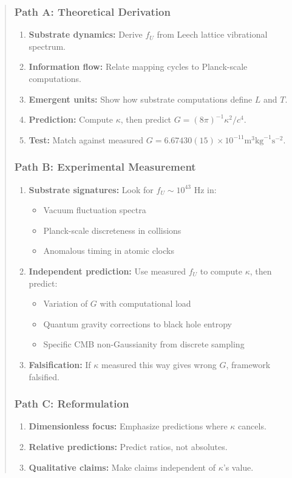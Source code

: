 \documentclass[11pt,titlepage]{article}
\begin{document}
\begin{abstract}
\subsubsection{Path A: Theoretical Derivation}
\begin{enumerate}
\item \textbf{Substrate dynamics:} Derive $f_U$ from Leech lattice vibrational spectrum.
\item \textbf{Information flow:} Relate mapping cycles to Planck-scale computations.
\item \textbf{Emergent units:} Show how substrate computations define $L$ and $T$.
\item \textbf{Prediction:} Compute $\kappa$, then predict $G = (8\pi)^{-1} \kappa^2 / c^4$.
\item \textbf{Test:} Match against measured $G = 6.67430(15) \times 10^{-11} \text{m}^3\text{kg}^{-1}\text{s}^{-2}$.
\end{enumerate}

\subsubsection{Path B: Experimental Measurement}
\begin{enumerate}
\item \textbf{Substrate signatures:} Look for $f_U \sim 10^{43}$ Hz in:
\begin{itemize}
\item Vacuum fluctuation spectra
\item Planck-scale discreteness in collisions
\item Anomalous timing in atomic clocks
\end{itemize}

\item \textbf{Independent prediction:} Use measured $f_U$ to compute $\kappa$, then predict:
\begin{itemize}
\item Variation of $G$ with computational load
\item Quantum gravity corrections to black hole entropy
\item Specific CMB non-Gaussianity from discrete sampling
\end{itemize}

\item \textbf{Falsification:} If $\kappa$ measured this way gives wrong $G$, framework falsified.
\end{enumerate}

\subsubsection{Path C: Reformulation}
\begin{enumerate}
\item \textbf{Dimensionless focus:} Emphasize predictions where $\kappa$ cancels.
\item \textbf{Relative predictions:} Predict ratios, not absolutes.
\item \textbf{Qualitative claims:} Make claims independent of $\kappa$'s value.
\end{enumerate}


\end{abstract}
\end{document}
